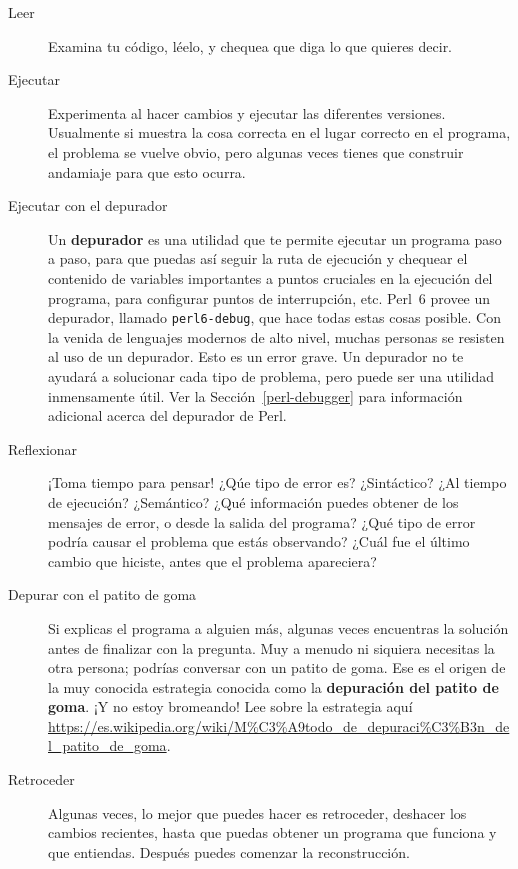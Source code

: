 \begin{description}

\item[Leer] Examina tu código, léelo, y chequea que 
diga lo que quieres decir.

\item[Ejecutar] Experimenta al hacer cambios y ejecutar las
diferentes versiones. Usualmente si muestra la cosa correcta
en el lugar correcto en el programa, el problema se vuelve 
obvio, pero algunas veces tienes que construir andamiaje para
que esto ocurra.

\item[Ejecutar con el depurador] Un {\bf depurador} es una
utilidad que te permite ejecutar un programa paso a paso,
para que puedas así seguir la ruta de ejecución y chequear
el contenido de variables importantes a puntos cruciales en
la ejecución del programa, para configurar puntos de 
interrupción, etc. Perl~6 provee un depurador, llamado 
{\tt perl6-debug}, que hace todas estas cosas posible.
Con la venida de lenguajes modernos de alto nivel, muchas
personas se resisten al uso de un depurador. Esto es un
error grave. Un depurador no te ayudará a solucionar cada 
tipo de problema, pero puede ser una utilidad inmensamente
útil. Ver la Sección~\ref{perl-debugger} para información 
adicional acerca del depurador de Perl.

\item[Reflexionar] ¡Toma tiempo para pensar! ¿Qúe tipo de error
es? ¿Sintáctico? ¿Al tiempo de ejecución? ¿Semántico?
¿Qué información puedes obtener de los mensajes de error, o desde
la salida del programa? ¿Qué tipo de error podría causar el problema
que estás observando? ¿Cuál fue el último cambio que hiciste, antes
que el problema apareciera?

\item[Depurar con el patito de goma] Si explicas el programa 
a alguien más, algunas veces encuentras la solución antes
de finalizar con la pregunta. Muy a menudo ni siquiera
necesitas la otra persona; podrías conversar con un patito
de goma. Ese es el origen de la muy conocida estrategia
conocida como la {\bf depuración del patito de goma}. 
¡Y no estoy bromeando! Lee sobre la estrategia aquí
\url{https://es.wikipedia.org/wiki/M%C3%A9todo_de_depuraci%C3%B3n_del_patito_de_goma}.

\item[Retroceder] Algunas veces, lo mejor que puedes hacer es
retroceder, deshacer los cambios recientes, hasta que puedas
obtener un programa que funciona y que entiendas. Después puedes
comenzar la reconstrucción.

\end{description}


